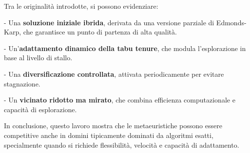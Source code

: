 \documentclass[12pt,a4paper]{article}
\begin{document}
Tra le originalità introdotte, si possono evidenziare:

    
- Una \textbf{soluzione iniziale ibrida}, derivata da una versione parziale di Edmonds-Karp, che garantisce un punto di partenza di alta qualità.
    
- Un’\textbf{adattamento dinamico della tabu tenure}, che modula l’esplorazione in base al livello di stallo.
    
- Una \textbf{diversificazione controllata}, attivata periodicamente per evitare stagnazione.
    
- Un \textbf{vicinato ridotto ma mirato}, che combina efficienza computazionale e capacità di esplorazione.

In conclusione, questo lavoro mostra che le metaeuristiche possono essere competitive anche in domini tipicamente dominati da algoritmi esatti, specialmente quando si richiede flessibilità, velocità e capacità di adattamento.
\end{document}
